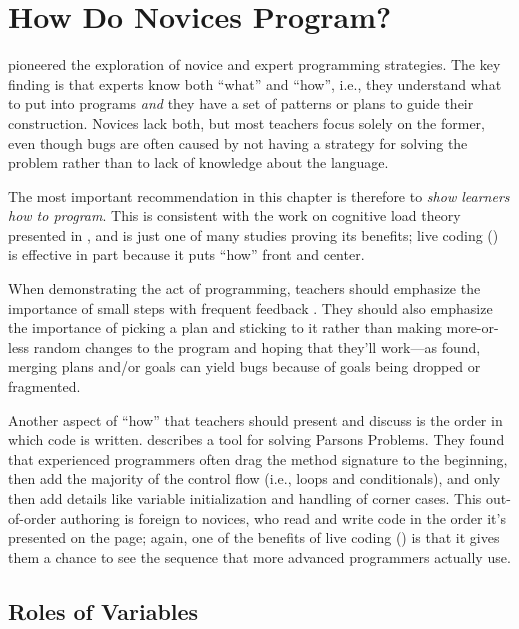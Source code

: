 \section{How Do Novices Program?}\label{s:pck-programming}

\cite{Solo1984,Solo1986} pioneered the exploration of novice and
expert programming strategies.  The key finding is that experts know
both ``what'' and ``how'', i.e., they understand what to put into
programs \emph{and} they have a set of patterns or plans to guide
their construction.  Novices lack both, but most teachers focus solely
on the former, even though bugs are often caused by not having a
strategy for solving the problem rather than to lack of knowledge
about the language.

The most important recommendation in this chapter is therefore to
\emph{show learners how to program}.  This is consistent with the work
on cognitive load theory presented in , and
\cite{Mull2007b} is just one of many studies proving its benefits;
live coding () is effective in part because
it puts ``how'' front and center.

When demonstrating the act of programming, teachers should emphasize
the importance of small steps with frequent feedback \cite{Blik2014}.
They should also emphasize the importance of picking a plan and
sticking to it rather than making more-or-less random changes to the
program and hoping that they'll work---as \cite{Spoh1985} found,
merging plans and/or goals can yield bugs because of goals being
dropped or fragmented.

Another aspect of ``how'' that teachers should present and discuss is
the order in which code is written.  \cite{Ihan2011} describes a tool
for solving Parsons Problems.  They found that experienced programmers
often drag the method signature to the beginning, then add the
majority of the control flow (i.e., loops and conditionals), and only
then add details like variable initialization and handling of corner
cases.  This out-of-order authoring is foreign to novices, who read
and write code in the order it's presented on the page; again, one of
the benefits of live coding () is that it
gives them a chance to see the sequence that more advanced programmers
actually use.

\subsection*{Roles of Variables}

